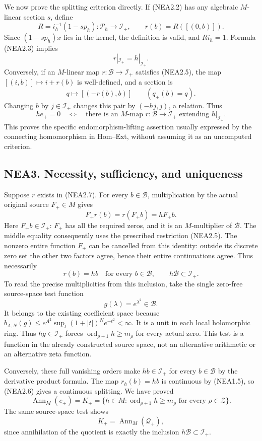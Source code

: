 We now prove the splitting criterion directly. If (NEA2.2) has any
algebraic \(M\)-linear section \(s\), define \[
R=i_h^{-1}(1-sp_h):\mathcal P_h\to\mathcal I_+,
\qquad r(b)=R([(0,b)]).
\tag{NEA2.4}
\] Since \((1-sp_h)x\) lies in the kernel, the definition is valid, and
\(R i_h=1\). Formula (NEA2.3) implies \[
r|_{\mathcal I_+}=h|_{\mathcal I_+}.
\tag{NEA2.5}
\] Conversely, if an \(M\)-linear map \(r:\mathcal B\to\mathcal I_+\)
satisfies (NEA2.5), the map \([(i,b)]\mapsto i+r(b)\) is well-defined,
and a section is \[
q\longmapsto[(-r(b),b)]\qquad(q_+(b)=q).
\tag{NEA2.6}
\] Changing \(b\) by \(j\in\mathcal I_+\) changes this pair by
\((-hj,j)\), a relation. Thus \[
h e_+=0\quad\Longleftrightarrow\quad
\text{there is an \(M\)-map }r:\mathcal B\to\mathcal I_+
\text{ extending }h|_{\mathcal I_+}.
\tag{NEA2.7}
\] This proves the specific endomorphism-lifting assertion usually
expressed by the connecting homomorphism in Hom--Ext, without assuming
it as an uncomputed criterion.

\subsection{NEA3. Necessity, sufficiency, and
uniqueness}\label{nea3.-necessity-sufficiency-and-uniqueness}

Suppose \(r\) exists in (NEA2.7). For every \(b\in\mathcal B\),
multiplication by the actual original source \(F_+\in M\) gives \[
F_+r(b)=r(F_+b)=hF_+b.
\tag{NEA3.1}
\] Here \(F_+b\in\mathcal I_+\): \(F_+\) has all the required zeros, and
it is an \(M\)-multiplier of \(\mathcal B\). The middle equality
consequently uses the prescribed restriction (NEA2.5). The nonzero
entire function \(F_+\) can be cancelled from this identity: outside its
discrete zero set the other two factors agree, hence their entire
continuations agree. Thus necessarily \[
r(b)=hb\quad\text{for every }b\in\mathcal B,
\qquad h\mathcal B\subset\mathcal I_+.
\tag{NEA3.2}
\] To read the precise multiplicities from this inclusion, take the
single zero-free source-space test function \[
g(\lambda)=e^{\lambda^2}\in\mathcal B.
\tag{NEA3.3}
\] It belongs to the existing coefficient space because
\(b_{A,N}(g)\le e^{A^2}\sup_t(1+|t|)^Ne^{-t^2}<\infty\). It is a unit in
each local holomorphic ring. Thus \(hg\in\mathcal I_+\) forces
\(\operatorname{ord}_{\rho+1}h\ge m_\rho\) for every actual zero. This
test is a function in the already constructed source space, not an
alternative arithmetic or an alternative zeta function.

Conversely, these full vanishing orders make \(hb\in\mathcal I_+\) for
every \(b\in\mathcal B\) by the derivative product formula. The map
\(r_h(b)=hb\) is continuous by (NEA1.5), so (NEA2.6) gives a continuous
splitting. We have proved \[
\boxed{\operatorname{Ann}_M(e_+)=K_+
=\{h\in M:\operatorname{ord}_{\rho+1}h\ge m_\rho\text{ for every }\rho\in\mathscr Z\}.}
\tag{NEA3.4}
\] The same source-space test shows \[
K_+=\operatorname{Ann}_M(\mathcal Q_+),
\tag{NEA3.5}
\] since annihilation of the quotient is exactly the inclusion
\(h\mathcal B\subset\mathcal I_+\).


